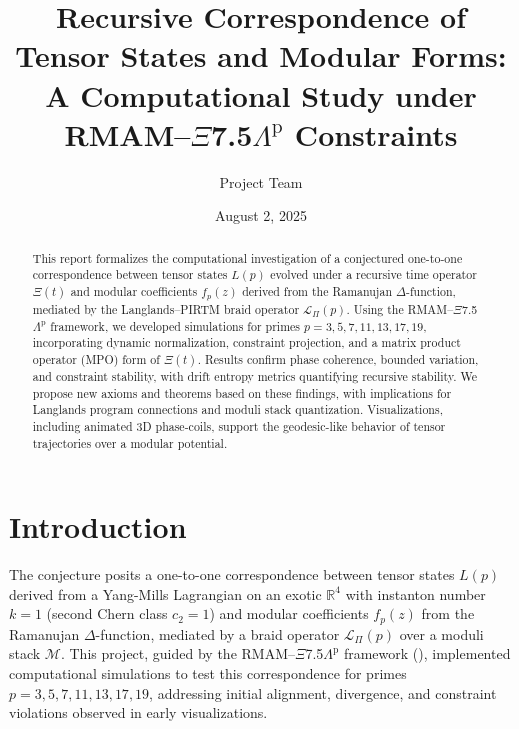 \documentclass[11pt]{article}
\newcommand{\XiOp}{\Xi(t)}
\newcommand{\BraidOp}{\mathcal{L}_\Pi(p)}
\newcommand{\ModSpace}{\mathcal{M}}
\newcommand{\TensorState}{L(p)}
\newcommand{\ModCoeff}{f_p(z)}
\begin{document}
\title{Recursive Correspondence of Tensor States and Modular Forms: A Computational Study under RMAM--$\Xi$7.5$\Lambda^\text{p}$ Constraints}
\author{Project Team}
\date{August 2, 2025}
\maketitle

\begin{abstract}
This report formalizes the computational investigation of a conjectured one-to-one correspondence between tensor states \( \TensorState \) evolved under a recursive time operator \( \XiOp \) and modular coefficients \( \ModCoeff \) derived from the Ramanujan \( \Delta \)-function, mediated by the Langlands--PIRTM braid operator \( \BraidOp \). Using the RMAM--$\Xi$7.5$\Lambda^\text{p}$ framework, we developed simulations for primes \( p = 3, 5, 7, 11, 13, 17, 19 \), incorporating dynamic normalization, constraint projection, and a matrix product operator (MPO) form of \( \XiOp \). Results confirm phase coherence, bounded variation, and constraint stability, with drift entropy metrics quantifying recursive stability. We propose new axioms and theorems based on these findings, with implications for Langlands program connections and moduli stack quantization. Visualizations, including animated 3D phase-coils, support the geodesic-like behavior of tensor trajectories over a modular potential.
\end{abstract}

\section{Introduction}
The conjecture posits a one-to-one correspondence between tensor states \( \TensorState \) derived from a Yang-Mills Lagrangian on an exotic \( \mathbb{R}^4 \) with instanton number \( k=1 \) (second Chern class \( c_2 = 1 \)) and modular coefficients \( \ModCoeff \) from the Ramanujan \( \Delta \)-function, mediated by a braid operator \( \BraidOp \) over a moduli stack \( \ModSpace \). This project, guided by the RMAM--$\Xi$7.5$\Lambda^\text{p}$ framework (\cite{PrimeAdvancements9}), implemented computational simulations to test this correspondence for primes \( p = 3, 5, 7, 11, 13, 17, 19 \), addressing initial alignment, divergence, and constraint violations observed in early visualizations.
\end{document}
